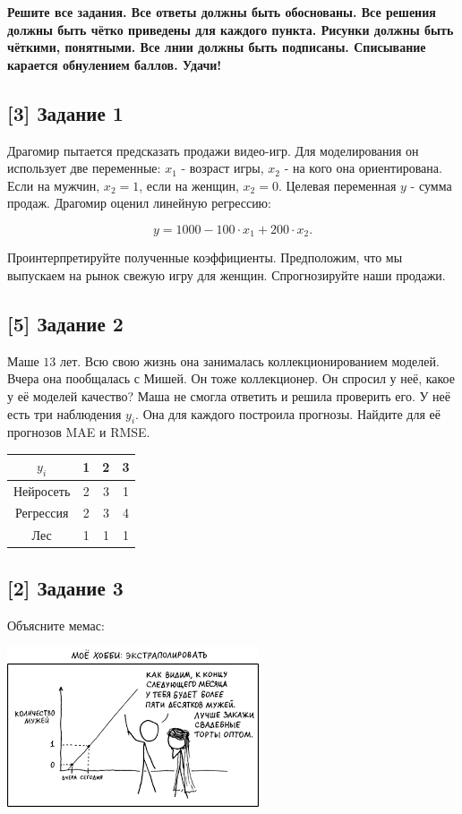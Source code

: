 \documentclass[12pt, a4paper, oneside]{article}
\begin{document}
\textbf{Решите все задания. Все ответы должны быть обоснованы. Все решения должны быть чётко приведены для каждого пункта. Рисунки должны быть чёткими, понятными. Все лнии должны быть подписаны. Списывание карается обнулением баллов. Удачи!}

\subsection*{[3] Задание 1 }

Драгомир пытается предсказать продажи видео-игр.  Для моделирования он использует две переменные: $x_1$ - возраст игры, $x_2$ - на кого она ориентирована. Если на мужчин, $x_2=1$, если на женщин, $x_2=0$. Целевая переменная $y$ - сумма продаж. Драгомир оценил линейную регрессию: 

$$ y = 1000 - 100 \cdot  x_1 + 200 \cdot  x_2.$$

Проинтерпретируйте полученные коэффициенты.  Предположим, что мы выпускаем на рынок свежую игру для женщин. Спрогнозируйте наши продажи. 


\subsection*{[5] Задание 2}

Маше $13$ лет. Всю свою жизнь она занималась коллекционированием моделей.  Вчера она пообщалась с Мишей. Он тоже коллекционер. Он спросил у неё, какое у её моделей качество? Маша не смогла ответить и решила проверить его. У неё есть три наблюдения $y_i$. Она для каждого построила прогнозы. Найдите для её прогнозов MAE и RMSE.

\begin{center}
	\begin{tabular}{c|c|c|c}
		$y_i$ &  1 & 2 & 3 \\
		\hline
		Нейросеть & 2 & 3 & 1  \\
		Регрессия &  2 & 3 & 4 \\
		Лес & 1 & 1 & 1 \\
	\end{tabular}
\end{center}


\subsection*{[2] Задание 3}

Объясните мемас: 

\begin{center}
	\includegraphics[scale=0.7]{memes.png}
\end{center}
\end{document}
